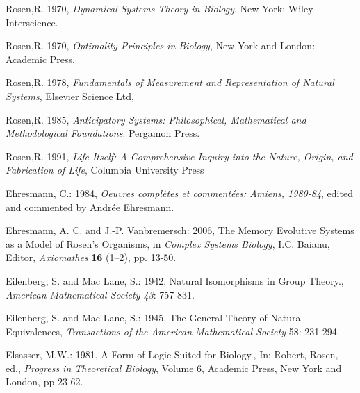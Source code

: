 \documentclass[12pt]{article}
\theoremstyle{plain}
\theoremstyle{definition}
\numberwithin{equation}{section}
\newcommand{\<}{{\langle}}
\begin{document}
\begin{thebibliography}{9}
Rosen,R. 1970, \emph{Dynamical Systems Theory in Biology}. New York: Wiley Interscience.

Rosen,R. 1970, \emph{Optimality Principles in Biology}, New York and London: Academic Press.

Rosen,R. 1978, \emph{Fundamentals of Measurement and Representation of Natural Systems}, Elsevier Science Ltd,

Rosen,R. 1985, \emph{Anticipatory Systems: Philosophical, Mathematical and Methodological Foundations}. Pergamon Press.

Rosen,R. 1991, \emph{Life Itself: A Comprehensive Inquiry into the Nature, Origin, and Fabrication of Life}, Columbia University Press

Ehresmann, C.: 1984, \emph{Oeuvres compl\`etes et comment\'ees: Amiens, 1980-84}, edited and commented
by Andr\'ee Ehresmann.

Ehresmann, A. C. and J.-P. Vanbremersch: 2006, The Memory Evolutive Systems as a Model of Rosen's Organisms,
in \emph{Complex Systems Biology}, I.C. Baianu, Editor, \emph{Axiomathes} \textbf{16} (1--2), pp. 13-50.

Eilenberg, S. and Mac Lane, S.: 1942, Natural Isomorphisms in Group Theory., \emph{American Mathematical Society 43}: 757-831.

Eilenberg, S. and Mac Lane, S.: 1945, The General Theory of Natural Equivalences,
\emph{Transactions of the American Mathematical Society} 58: 231-294.

Elsasser, M.W.: 1981, A Form of Logic Suited for Biology., In: Robert, Rosen, ed., \emph{Progress in Theoretical Biology}, Volume 6, Academic Press, New York and London, pp 23-62.

\end{thebibliography}

\end{document}
